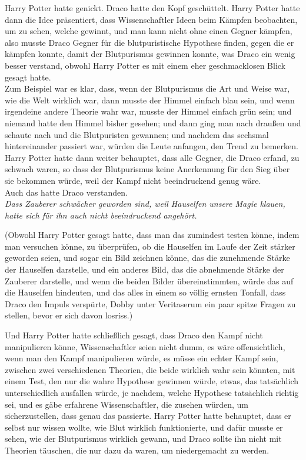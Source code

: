 {Harry Potter hatte genickt. Draco hatte den Kopf geschüttelt. Harry Potter hatte dann die Idee präsentiert, dass Wissenschaftler Ideen beim Kämpfen beobachten, um zu sehen, welche gewinnt, und man kann nicht ohne einen Gegner kämpfen, also musste Draco Gegner für die blutpuristische Hypothese finden, gegen die er kämpfen konnte, damit der Blutpurismus gewinnen konnte, was Draco ein wenig besser verstand, obwohl Harry Potter es mit einem eher geschmacklosen Blick gesagt hatte.\\ Zum Beispiel war es klar, dass, wenn der Blutpurismus die Art und Weise war, wie die Welt wirklich war, dann musste der Himmel einfach blau sein, und wenn irgendeine andere Theorie wahr war, musste der Himmel einfach grün sein; und niemand hatte den Himmel bisher gesehen; und dann ging man nach draußen und schaute nach und die Blutpuristen gewannen; und nachdem das sechsmal hintereinander passiert war, würden die Leute anfangen, den Trend zu bemerken. Harry Potter hatte dann weiter behauptet, dass alle Gegner, die Draco erfand, zu schwach waren, so dass der Blutpurismus keine Anerkennung für den Sieg über sie bekommen würde, weil der Kampf nicht beeindruckend genug wäre.\\ Auch das hatte Draco verstanden.\\ \emph{Dass Zauberer schwächer geworden sind, weil Hauselfen unsere Magie klauen, hatte sich für ihn auch nicht beeindruckend angehört.}

(Obwohl Harry Potter gesagt hatte, dass man das zumindest testen könne, indem man versuchen könne, zu überprüfen, ob die Hauselfen im Laufe der Zeit stärker geworden seien, und sogar ein Bild zeichnen könne, das die zunehmende Stärke der Hauselfen darstelle, und ein anderes Bild, das die abnehmende Stärke der Zauberer darstelle, und wenn die beiden Bilder übereinstimmten, würde das auf die Hauselfen hindeuten, und das alles in einem so völlig ernsten Tonfall, dass Draco den Impuls verspürte, Dobby unter Veritaserum ein paar spitze Fragen zu stellen, bevor er sich davon losriss.)

Und Harry Potter hatte schließlich gesagt, dass Draco den Kampf nicht manipulieren könne, Wissenschaftler seien nicht dumm, es wäre offensichtlich, wenn man den Kampf manipulieren würde, es müsse ein echter Kampf sein, zwischen zwei verschiedenen Theorien, die beide wirklich wahr sein könnten, mit einem Test, den nur die wahre Hypothese gewinnen würde, etwas, das tatsächlich unterschiedlich ausfallen würde, je nachdem, welche Hypothese tatsächlich richtig sei, und es gäbe erfahrene Wissenschaftler, die zusehen würden, um sicherzustellen, dass genau das passierte. Harry Potter hatte behauptet, dass er selbst nur wissen wollte, wie Blut wirklich funktionierte, und dafür musste er sehen, wie der Blutpurismus wirklich gewann, und Draco sollte ihn nicht mit Theorien täuschen, die nur dazu da waren, um niedergemacht zu werden.

}
